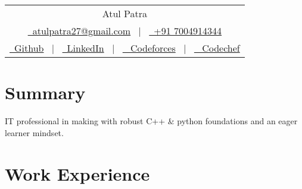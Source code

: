 \documentclass[a4paper,10pt]{article}
\begin{document}
\pagestyle{empty} 



\begin{tabularx}{\linewidth}{@{} C @{}}
\Huge{Atul Patra} \\[7.5pt]
\href{mailto:atulpatra27@gmail.com}{\raisebox{-0.05\height} \ atulpatra27@gmail.com} \ $|$ \ 
\href{tel:+91 7004914344}{\raisebox{-0.05\height}\ +91 7004914344} \\


\href{https://github.com/flxcsx}{\raisebox{-0.05\height}\ Github} \ $|$ \ 
\href{https://www.linkedin.com/in/altxt/}{\raisebox{-0.05\height}\ LinkedIn} \ $|$ \ 
\href{https://codeforces.com/profile/altxt}{\raisebox{-0.05\height} \ Codeforces} \ $|$ \ 
\href{https://codechef.com/user/altxt}{\raisebox{-0.05\height} \ Codechef} 
\end{tabularx}


\section{Summary}
IT professional in making with robust C++ \& python foundations and an eager learner mindset.

\section{Work Experience}
\end{document}
